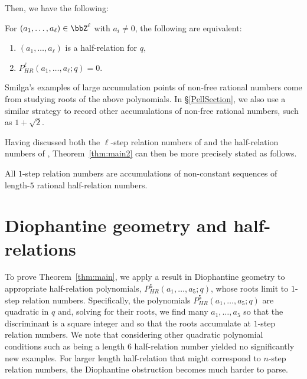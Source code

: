 \documentclass[11 pt]{amsart}
\begin{document}
    Then, we have the following:

    \begin{proposition} For $(a_1,\ldots,a_\ell)\in\bbZ^\ell$ with $a_i \neq 0$,  the following are equivalent:\begin{enumerate}
            \item $(a_1, \ldots, a_\ell)$ is a half-relation for $q$,
            \item $P_{HR}^\ell(a_1, \ldots, a_\ell; q) = 0$.
        \end{enumerate}
\end{proposition}

Smilga's examples of large accumulation points of non-free rational numbers come from studying roots of the above polynomials. In \S\ref{PellSection}, we also use a similar strategy to record other accumulations of non-free rational numbers, such as $1+\sqrt{2}$. 

Having discussed both the $\ell$-step relation numbers of \cite{kimkoberda} and the half-relation numbers of \cite{Smilga2021}, Theorem~\ref{thm:main2} can then be more precisely stated as follows.

\begin{theorem}
\label{thm:main}
All $1$-step relation numbers are accumulations of non-constant sequences of length-$5$ rational half-relation numbers.
\end{theorem}

\section{Diophantine geometry and half-relations}\label{DiophantineSection}

To prove Theorem~\ref{thm:main}, we apply a result in Diophantine geometry to appropriate half-relation polynomials, $P_{HR}^5(a_1,\ldots,a_5;q)$, whose roots limit to $1$-step relation numbers. Specifically, the polynomials $P_{HR}^5(a_1,\ldots,a_5;q)$ are quadratic in $q$ and, solving for their roots, we find many $a_1,\ldots,a_5$ so that the discriminant is a square integer and so that the roots accumulate at $1$-step relation numbers. We note that considering other quadratic polynomial conditions such as being a length $6$ half-relation number yielded no significantly new examples. For larger length half-relation that might correspond to $n$-step relation numbers, the Diophantine obstruction becomes much harder to parse.
\end{document}
